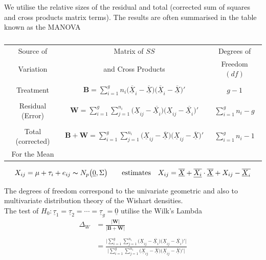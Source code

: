 \documentclass[11pt,a4paper]{article}
\theoremstyle{definition}
\begin{document}
We utilise the relative sizes of the residual and total (corrected sum of  squares and cross products matrix terms). The results are often summarised in the table known as the MANOVA


\begin{table}[H]
\centering
\begin{tabular}{|c|c|c|}
\hline
Source of & Matrix of $SS$ & Degrees of\\
Variation & and Cross Products & Freedom $(df)$\\
\hline
&&\\
Treatment & $\textbf{B}=\displaystyle{\sum^g_{i=1}n_i\big(\overline{\underline{X}}_i-\overline{\underline{X}}\big)\big(\overline{\underline{X}}_i-\overline{\underline{X}}\big)'}$ & $g-1$\\
&&\\
Residual (Error) & $\textbf{W}=\displaystyle{\sum^g_{i=1}\sum^{n_i}_{j=1}\big(\underline{X}_{ij}-\overline{\underline{X}_i}\big)\big(\underline{X}_{ij}-\overline{\underline{X}_i}\big)'}$ & $\displaystyle{\sum^g_{i=1}n_i-g}$\\
&&\\
\hline
Total (corrected) & $\textbf{B}+ \textbf{W}=\displaystyle{\sum^g_{i=1}\sum^{n_i}_{j=1}\big(\underline{X}_{ij}-\overline{\underline{X}}\big)\big(\underline{X}_{ij}-\overline{\underline{X}}\big)'}$ & $\displaystyle{\sum^g_{i=1}n_i-1}$\\
For the Mean &&\\
\hline
\end{tabular}
\caption{}
\end{table}


$$X_{ij} = \mu + \tau_i + e_{ij} \thicksim N_p\big(\underline{0},\Sigma\big)\qquad \text{estimates}\quad  X_{ij}=\underline{\overline{X}}+\overline{\underline{X_i}}\cdot \overline{\underline{X}} + X_{ij}-\overline{\underline{X}_i}$$

The degrees of freedom correspond to the univariate geometric and also to multivariate distribution theory of the Wishart densities.\\

The test of $H_0: \underline{\tau}_1 = \underline{\tau}_2 = \cdots= \underline{\tau}_g = \underline{0}$ utilise the Wilk's Lambda
\begin{align*}
\Delta_W & = \frac{\Big|\textbf{W}\Big|}{\Big|\textbf{B}+\textbf{W}\Big|}\\\\
& = \frac{\Bigg|\displaystyle{\sum^g_{i=1}\sum^{n_i}_{j=1}\big(\underline{X}_{ij}-\overline{\underline{X}_i}\big)\big(\underline{X}_{ij}-\overline{\underline{X}_i}\big)'}\Bigg|}{\Bigg|\displaystyle{\sum^g_{i=1}\sum^{n_i}_{j=1}\big(\underline{X}_{ij}-\overline{\underline{X}}\big)\big(\underline{X}_{ij}-\overline{\underline{X}}\big)'}\Bigg|}\tag{9}
\end{align*}
\end{document}
